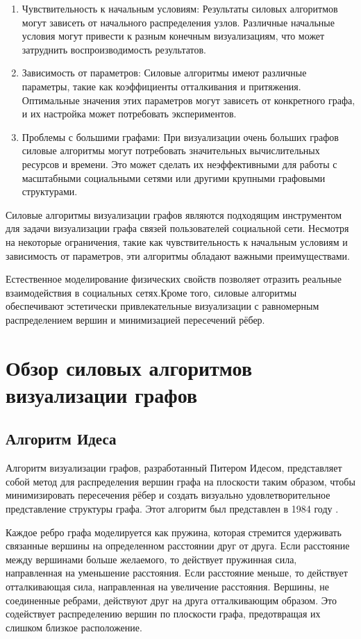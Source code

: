 \documentclass[14pt, russian]{scrartcl}
\begin{document}
\begin{enumerate}
  \item{Чувствительность к начальным условиям: Результаты силовых алгоритмов могут зависеть от начального распределения узлов. Различные начальные условия могут привести к разным конечным визуализациям, что может затруднить воспроизводимость результатов.}
  \item{Зависимость от параметров: Силовые алгоритмы имеют различные параметры, такие как коэффициенты отталкивания и притяжения. Оптимальные значения этих параметров могут зависеть от конкретного графа, и их настройка может потребовать экспериментов.}
  \item{Проблемы с большими графами:
При визуализации очень больших графов силовые алгоритмы могут потребовать значительных вычислительных ресурсов и времени. Это может сделать их неэффективными для работы с масштабными социальными сетями или другими крупными графовыми структурами.}
\end{enumerate}

Силовые алгоритмы визуализации графов являются подходящим инструментом для задачи визуализации графа связей пользователей социальной сети. Несмотря на некоторые ограничения, такие как чувствительность к начальным условиям и зависимость от параметров, эти алгоритмы обладают важными преимуществами.

Естественное моделирование физических свойств позволяет отразить реальные взаимодействия в социальных сетях.Кроме того, силовые алгоритмы обеспечивают эстетически привлекательные визуализации с равномерным распределением вершин и минимизацией пересечений рёбер.



\section{Обзор силовых алгоритмов визуализации графов}

\subsection{Алгоритм Идеса}

Алгоритм визуализации графов, разработанный Питером Идесом, представляет собой метод для распределения вершин графа на плоскости таким образом, чтобы минимизировать пересечения рёбер и создать визуально удовлетворительное представление структуры графа. Этот алгоритм был представлен в 1984 году \cite{Eades}.

Каждое ребро графа моделируется как пружина, которая стремится удерживать связанные вершины на определенном расстоянии друг от друга. Если расстояние между вершинами больше желаемого, то действует пружинная сила, направленная на уменьшение расстояния. Если расстояние меньше, то действует отталкивающая сила, направленная на увеличение расстояния. Вершины, не соединенные ребрами, действуют друг на друга отталкивающим образом. Это содействует распределению вершин по плоскости графа, предотвращая их слишком близкое расположение. 
\end{document}
